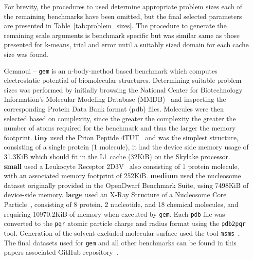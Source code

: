 \documentclass[../document.tex]{subfiles}
\begin{document}
For brevity, the procedures to used determine appropriate problem sizes each of the remaining benchmarks have been omitted, but the final selected parameters are presented in Table~\ref{tab:problem_sizes}.
The procedure to generate the remaining scale arguments is benchmark specific but was similar same as those presented for k-means, trial and error until a suitably sized domain for each cache size was found.

Gemnoui -- {\tt gem} is an n-body-method based benchmark which computes electrostatic potential of biomolecular structures.
Determining suitable problem sizes was performed by initially browsing the National Center for Biotechnology Information's Molecular Modeling Database (MMDB)~\cite{madej2013mmdb} and inspecting the corresponding Protein Data Bank format (pdb) files.
Molecules were then selected based on complexity, since the greater the complexity the greater the number of atoms required for the benchmark and thus the larger the memory footprint.
{\bf tiny} used the Prion Peptide 4TUT~\cite{yu2015crystal} and was the simplest structure, consisting of a single protein (1 molecule), it had the device side memory usage of 31.3KiB which should fit in the L1 cache (32KiB) on the Skylake processor.
{\bf small} used a Leukocyte Receptor 2D3V~\cite{shiroishi2006crystal} also consisting of 1 protein molecule, with an associated memory footprint of 252KiB.
{\bf medium} used the nucleosome dataset originally provided in the OpenDwarf Benchmark Suite, using 7498KiB of device-side memory.
{\bf large} used an X-Ray Structure of a Nucleosome Core Particle~\cite{davey2002solvent}, consisting of 8 protein, 2 nucleotide, and 18 chemical molecules, and requiring 10970.2KiB of memory when executed by {\tt gem}.
Each {\tt pdb} file was converted to the {\tt pqr} atomic particle charge and radius format using the {\tt pdb2pqr}~\cite{dolinsky2004pdb2pqr} tool.
Generation of the solvent excluded molecular surface used the tool {\tt msms}~\cite{sanner1996reduced}.
The final datasets used for {\tt gem} and all other benchmarks can be found in this papers associated GitHub repository~\cite{johnston2017}.
\end{document}
